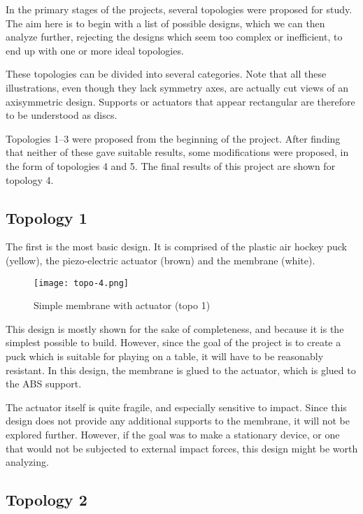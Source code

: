 In the primary stages of the projects, several topologies were proposed for
study. The aim here is to begin with a list of possible designs, which we can
then analyze further, rejecting the designs which seem too complex or
inefficient, to end up with one or more ideal topologies.

These topologies can be divided into several categories. Note that all these
illustrations, even though they lack symmetry axes, are actually cut views of an
axisymmetric design. Supports or actuators that appear rectangular are therefore
to be understood as discs.

Topologies \numrange{1}{3} were proposed from the beginning of the project.
After finding that neither of these gave suitable results, some modifications
were proposed, in the form of topologies 4 and 5. The final results of this
project are shown for topology 4.

\subsection{Topology 1}

The first  is the most basic design. It is comprised of the plastic air hockey
puck (yellow), the piezo-electric actuator (brown) and the membrane (white).

\begin{figure}[h]
  \begin{center}
    \texttt{[image: topo-4.png]}
  \end{center}
  \caption{Simple membrane with actuator (topo 1)}
  \label{fig:topo-4}
\end{figure}

This design is mostly shown for the sake of completeness, and because it is the
simplest possible to build. However, since the goal of the project is to create
a puck which is suitable for playing on a table, it will have to be reasonably
resistant. In this design, the membrane is glued to the actuator, which is glued
to the ABS support.

The actuator itself is quite fragile, and especially sensitive to impact. Since
this design does not provide any additional supports to the membrane, it will
not be explored further. However, if the goal was to make a stationary device,
or one that would not be subjected to external impact forces, this design might
be worth analyzing.

\subsection{Topology 2}

